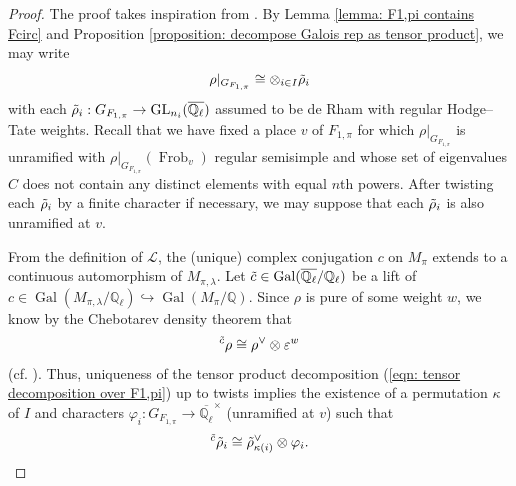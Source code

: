 \documentclass{amsart}
\theoremstyle{definition}
\numberwithin{equation}{section} %
\newcommand{\GL}{\operatorname{GL}}
\newcommand{\Qlbar}{\ensuremath{\overline{\mathbb{Q}_\ell}}}
\newcommand{\Frob}{\operatorname{Frob}}
\newcommand{\Gal}{\operatorname{Gal}}
\newcommand{\eps}{\varepsilon}
\newcommand{\bb}[1]{\mathbb{#1}}
\begin{document}
\begin{proof}
The proof takes inspiration from \cite[Section 7]{Xia19}.
By Lemma \ref{lemma: F1,pi contains Fcirc} and Proposition \ref{proposition: decompose Galois rep as tensor product}, we may write
\begin{equation} \label{eqn: tensor decomposition over F1,pi}
\rho|_{G_{F_{1,\pi}}} \cong \otimes_{i \in I} \Tilde{\rho}_i    
\end{equation}
with each $\Tilde{\rho}_i: G_{F_{1,\pi}} \to \GL_{n_i}(\Qlbar)$ assumed to be de Rham with regular Hodge--Tate weights.
Recall that we have fixed a place $v$ of $F_{1,\pi}$ for which $\rho|_{G_{F_{1,\pi}}}$ is unramified with $\rho|_{G_{F_{1,\pi}}}(\Frob_v)$ regular semisimple and whose set of eigenvalues $C$ does not contain any distinct elements with equal $n$th powers.
After twisting each $\Tilde{\rho}_i$ by a finite character if necessary, we may suppose that each $\Tilde{\rho}_i$ is also unramified at $v$.

From the definition of $\mathcal{L}$, the (unique) complex conjugation \( c \) on $M_\pi$ extends to a continuous automorphism of $M_{\pi,\lambda}$.
Let $\Tilde{c} \in \Gal(\Qlbar/\bb{Q}_\ell)$ be a lift of $c \in \Gal(M_{\pi,\lambda}/\mathbb{Q}_\ell) \hookrightarrow \Gal(M_{\pi}/\bb{Q})$.
Since $\rho$ is pure of some weight $w$, we know by the Chebotarev density theorem that
\[
{}^{\Tilde{c}} \rho \cong \rho^\vee \otimes \eps^{w}
\]
(cf. \cite[Lemma 1.2(1)]{PatTay15}).
Thus, uniqueness of the tensor product decomposition (\ref{eqn: tensor decomposition over F1,pi}) up to twists implies the existence of a permutation $\kappa$ of $I$ 
and characters $\varphi_i: G_{F_{1,\pi}} \to \Qlbar^\times$ (unramified at $v$) such that
\begin{equation} \label{eqn: kappa defining property}
 {}^{\Tilde{c}} \Tilde{\rho}_i \cong \Tilde{\rho}_{\kappa(i)}^\vee \otimes \varphi_i.   
\end{equation}


\end{proof}
\end{document}
